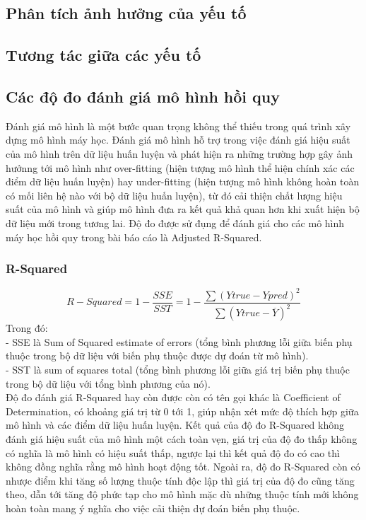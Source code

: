 \documentclass[runningheads]{llncs}
\begin{document}
\subsection{Phân tích ảnh hưởng của yếu tố}

\subsection{Tương tác giữa các yếu tố}

\subsection{Các độ đo đánh giá mô hình hồi quy}
Đánh giá mô hình là một bước quan trọng không thể thiếu trong quá trình xây dựng mô hình máy học. Đánh giá mô hình hỗ trợ trong việc đánh giá hiệu suất của mô hình trên dữ liệu huấn luyện và phát hiện ra những trường hợp gây ảnh hưởnng tới mô hình như over-fitting (hiện tượng mô hình thể hiện chính xác các điểm dữ liệu huấn luyện) hay under-fitting (hiện tượng mô hình không hoàn toàn có mối liên hệ nào với bộ dữ liệu huấn luyện), từ đó cải thiện chất lượng hiệu suất của mô hình và giúp mô hình đưa ra kết quả khả quan hơn khi xuất hiện bộ dữ liệu mới trong tương lai. Độ đo được sử đụng để đánh giá cho các mô hình máy học hồi quy trong bài báo cáo là Adjusted R-Squared.


\subsubsection{R-Squared}
\begin{equation}
	R-Squared = 1- \frac{SSE}{SST} =  1 - \frac{\sum (Ytrue - Ypred)^2}{\sum (Ytrue - \overline{Y})^2}
\end{equation}
Trong đó:\\
- SSE là Sum of Squared estimate of errors (tổng bình phương lỗi giữa biến phụ thuộc trong bộ dữ liệu với biến phụ thuộc được dự đoán từ mô hình).\\
- SST là sum of squares total (tổng bình phương lỗi giữa giá trị biến phụ thuộc trong bộ dữ liệu với tổng bình phương của nó).\\

Độ đo đánh giá R-Squared hay còn được còn có tên gọi khác là Coefficient of Determination, có khoảng giá trị từ 0 tới 1, giúp nhận xét mức độ thích hợp giữa mô hình và các điểm dữ liệu huấn luyện. Kết quả của độ đo R-Squared không đánh giá hiệu suất của mô hình một cách toàn vẹn, giá trị của độ đo thấp không có nghĩa là mô hình có hiệu suất thấp, ngược lại thì kết quả độ đo có cao thì không đồng nghĩa rằng mô hình hoạt động tốt. Ngoài ra, độ đo R-Squared còn có nhược điểm khi tăng số lượng thuộc tính độc lập thì giá trị của độ đo cũng tăng theo, dẫn tới tăng độ phức tạp cho mô hình mặc dù những thuộc tính mới không hoàn toàn mang ý nghĩa cho việc cải thiện dự đoán biến phụ thuộc.
\end{document}
